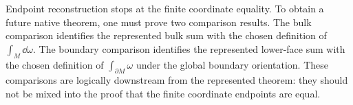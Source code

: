Endpoint reconstruction stops at the finite coordinate equality.  To obtain a
future native theorem, one must prove two comparison results.  The bulk
comparison identifies the represented bulk sum with the chosen definition of
\(\int_M\dd\omega\).  The boundary comparison identifies the represented
lower-face sum with the chosen definition of \(\int_{\partial M}\omega\) under
the global boundary orientation.  These comparisons are logically downstream
from the represented theorem: they should not be mixed into the proof that the
finite coordinate endpoints are equal.
